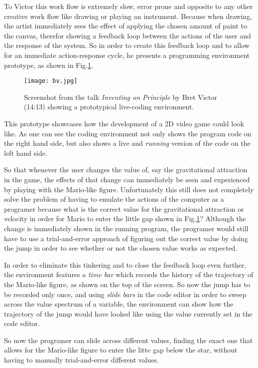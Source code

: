 To Victor this work flow is extremely slow, error prone and opposite
to any other creative work flow like drawing or playing an instrument.
Because when drawing, the artist immediately sees the effect of applying
the chosen amount of paint to the canvas, therefor showing a feedback
loop between the actions of the user and the response of the system.
So in order to create this feedback loop and to allow for an immediate
action-response cycle, he presents a programming environment
prototype, as shown in Fig.\ref{bv}.

\begin{figure}[h]
  \texttt{[image: bv.jpg]}
  \caption{Screenshot from the talk \textit{Inventing on Principle} by
          Bret Victor (14:13) showing a prototypical live-coding
          environment.}
  \label{bv}
\end{figure}

This prototype showcases how the development of a 2D video game could
look like. As one can see the coding environment not only shows
the program code on the right hand side, but also shows a live and
\textit{running} version of the code on the left hand side.

So that whenever the user changes the value of, say the gravitational
attraction in the game, the effects of that change can immediately be
seen and experienced by playing with the Mario-like figure.
Unfortunately this still does not completely solve the problem of
having to emulate the actions of the computer as a programer because
what is the correct value for the gravitational attraction or velocity
in order for Mario to enter the little gap shown in Fig.\ref{bv}?
Although the change is immediately shown in the running program,
the programer would still have to use a trial-and-error approach
of figuring out the correct value by doing the jump in order to
see whether or not the chosen value works as expected.

In order to eliminate this tinkering and to close the feedback
loop even further, the environment features a \textit{time bar}
which records the history of the trajectory of the Mario-like
figure, as shown on the top of the screen.
So now the jump has to be recorded only once, and using
\textit{slide bars} in the code editor in order to sweep across
the value spectrum of a variable, the environment can show how
the trajectory of the jump would have looked like using the value
currently set in the code editor.

So now the programer can slide across different values, finding
the exact one that allows for the Mario-like figure to enter the litte gap
below the star, without having to manually trial-and-error different
values.
\newline

